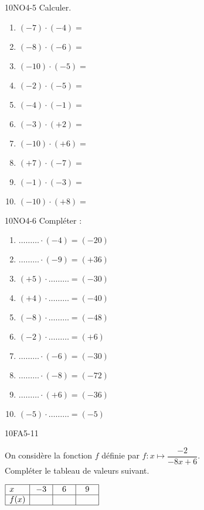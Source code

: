 \documentclass[a4paper,12pt]{report}
\begin{document}
\begin{EXO}{}{10NO4-5}
Calculer.

\begin{enumerate}[itemsep=2em]
	\item $ (-7) \cdot  (-4) =$
	\item $ (-8) \cdot  (-6) =$
	\item $ (-10) \cdot  (-5) =$
	\item $ (-2) \cdot  (-5) =$
	\item $ (-4) \cdot  (-1) =$
	\item $ (-3) \cdot  (+2) =$
	\item $ (-10) \cdot  (+6) =$
	\item $ (+7) \cdot  (-7) =$
	\item $ (-1) \cdot  (-3) =$
	\item $ (-10) \cdot  (+8) =$
\end{enumerate}
\end{EXO}

\begin{EXO}{}{10NO4-6}
Compléter :

\begin{enumerate}[itemsep=2em]
	\item $ \ldots\ldots\ldots \cdot (-4) = (-20) $
	\item $ \ldots\ldots\ldots \cdot (-9) = (+36) $
	\item $ (+5) \cdot \ldots\ldots\ldots = (-30) $
	\item $ (+4) \cdot \ldots\ldots\ldots = (-40) $
	\item $ (-8) \cdot \ldots\ldots\ldots = (-48) $
	\item $ (-2) \cdot \ldots\ldots\ldots = (+6) $
	\item $ \ldots\ldots\ldots \cdot (-6) = (-30) $
	\item $ \ldots\ldots\ldots \cdot (-8) = (-72) $
	\item $ \ldots\ldots\ldots \cdot (+6) = (-36) $
	\item $ (-5) \cdot \ldots\ldots\ldots = (-5) $
\end{enumerate}
\end{EXO}

\begin{EXO}{}{10FA5-11}


 On considère la fonction $f$ définie par $f:x\mapsto \dfrac{-2}{-8x+6}$. \\Compléter le tableau de valeurs suivant.

\medskip
$\begin{array}{|l|c|c|c|}
\hline
x & -3 & 6 & 9 \\
\hline
f(x) & \phantom{-10} & \phantom{-10} & \phantom{-10} \\
\hline
\end{array}
$
\end{EXO}
\end{document}
